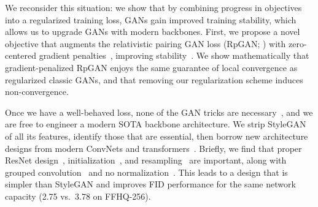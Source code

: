 We reconsider this situation: we show that by combining progress in objectives into a regularized training loss, GANs gain improved training stability, which allows us to upgrade GANs with modern backbones. 
First, we propose a novel objective that augments the relativistic pairing GAN loss (RpGAN; \cite{rgan}) with zero-centered gradient penalties~\cite{r1,r1r2}, improving stability~\cite{wgan-gp,r1r2,r1}. 
We show mathematically that gradient-penalized RpGAN enjoys the same guarantee of local convergence as regularized classic GANs, and that removing our regularization scheme induces non-convergence. 

Once we have a well-behaved loss, none of the GAN tricks are necessary~\cite{pggan,sg2}, and we are free to engineer a modern SOTA backbone architecture. We strip StyleGAN of all its features, identify those that are essential, then borrow new architecture designs from modern ConvNets and transformers~\cite{convnext,metaformer}. Briefly, we find that proper ResNet design~\cite{resnet2,mobnet}, initialization~\cite{fixup}, and resampling~\cite{sg1,sg2,sg3,blurpool} are important, along with grouped convolution~\cite{resnext,xception} and no normalization~\cite{sg2,edm2,wgan-gp,esrgan,nfnet}. This leads to a design that is simpler than StyleGAN and improves FID performance for the same network capacity (2.75 vs.~3.78 on FFHQ-256).



